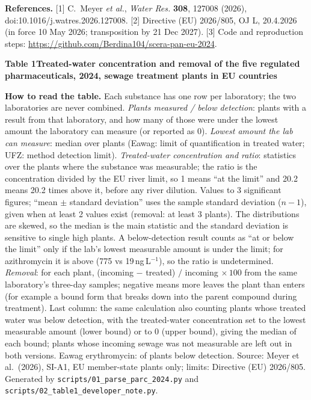 \documentclass[10pt,a4paper]{article}
\newcommand{\ngL}{ng\,L$^{-1}$}
\begin{document}
{\footnotesize\textbf{References.} [1] C.~Meyer \emph{et al.}, \emph{Water Res.} \textbf{308}, 127008 (2026), doi:10.1016/j.watres.2026.127008. [2] Directive (EU) 2026/805, OJ L, 20.4.2026 (in force 10 May 2026; transposition by 21 Dec 2027). [3] Code and reproduction steps: \url{https://github.com/Berdina104/scera-pan-eu-2024}.\par}

\newpage
\begin{landscape}
\thispagestyle{empty}
\captionsetup{width=0.97\linewidth}
{\large\bfseries Table 1\quad Treated-water concentration and removal of the five regulated pharmaceuticals, 2024, \Nplants{} sewage treatment plants in \Nctry{} EU countries}\par
\vspace{4pt}
\footnotesize\setlength{\tabcolsep}{3pt}
\renewcommand{\arraystretch}{1.18}

\par\vspace{5pt}
{\footnotesize
\textbf{How to read the table.} Each substance has one row per laboratory; the two laboratories are never combined. \emph{Plants measured / below detection}: plants with a result from that laboratory, and how many of those were under the lowest amount the laboratory can measure (or reported as 0). \emph{Lowest amount the lab can measure}: median over plants (Eawag: limit of quantification in treated water; UFZ: method detection limit). \emph{Treated-water concentration and ratio}: statistics over the plants where the substance was measurable; the ratio is the concentration divided by the EU river limit, so 1 means ``at the limit'' and 20.2 means 20.2 times above it, before any river dilution. Values to 3 significant figures; ``mean $\pm$ standard deviation'' uses the sample standard deviation ($n-1$), given when at least 2 values exist (removal: at least 3 plants). The distributions are skewed, so the median is the main statistic and the standard deviation is sensitive to single high plants. A below-detection result counts as ``at or below the limit'' only if the lab's lowest measurable amount is under the limit; for azithromycin it is above (775 vs 19\,\ngL), so the ratio is undetermined. \emph{Removal}: for each plant, (incoming $-$ treated) $/$ incoming $\times\,100$ from the same laboratory's three-day samples; negative means more leaves the plant than enters (for example a bound form that breaks down into the parent compound during treatment). Last column: the same calculation also counting plants whose treated water was below detection, with the treated-water concentration set to the lowest measurable amount (lower bound) or to 0 (upper bound), giving the median of each bound; plants whose incoming sewage was not measurable are left out in both versions. Eawag erythromycin: \eryBelowe{} of \Nplants{} plants below detection. Source: Meyer et al.\ (2026), SI-A1, EU member-state plants only; limits: Directive (EU) 2026/805. Generated by \texttt{scripts/01\_parse\_parc\_2024.py} and \texttt{scripts/02\_table1\_developer\_note.py}.
}
\end{landscape}
\end{document}
